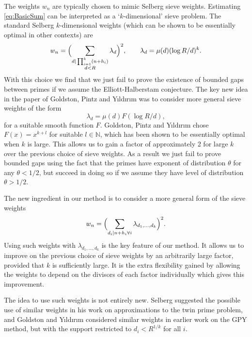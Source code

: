\documentclass[12pt,a4paper]{amsart}
\theoremstyle{plain}
\numberwithin{sblmm}{thrm}
\numberwithin{equation}{section}
\begin{document}
The weights $w_n$ are typically chosen to mimic Selberg sieve weights. Estimating \eqref{eq:BasicSum} can be interpreted as a `$k$-dimensional' sieve problem. The standard Selberg $k$-dimensional weights (which can be shown to be essentially optimal in other contexts) are
\begin{equation}
w_n=\Bigl(\sum_{\substack{d|\prod_{i=1}^k(n+h_i)\\ d<R}}\lambda_d\Bigr)^2,\qquad \lambda_d=\mu(d)(\log{R/d})^k.
\end{equation}
With this choice we find that we just fail to prove the existence of bounded gaps between primes if we assume the Elliott-Halberstam conjecture. The key new idea in the paper of Goldston, Pintz and Y\i ld\i r\i m \cite{GPY} was to consider more general sieve weights of the form
\begin{equation}
\lambda_d=\mu(d)F(\log{R/d}),\label{eq:GPYWeights}
\end{equation}
for a suitable smooth function $F$. Goldston, Pintz and Y\i ld\i r\i m chose $F(x)=x^{k+l}$ for suitable $l\in\mathbb{N}$, which has been shown to be essentially optimal when $k$ is large. This allows us to gain a factor of approximately \num{2} for large $k$ over the previous choice of sieve weights. As a result we just fail to prove bounded gaps using the fact that the primes have exponent of distribution $\theta$ for any $\theta<1/2$, but succeed in doing so if we assume they have level of distribution $\theta>1/2$. 

The new ingredient in our method is to consider a more general form of the sieve weights
\begin{equation}
w_n=\Bigl(\sum_{d_i|n+h_i\forall i}\lambda_{d_1,\dotsc,d_k}\Bigr)^2.\label{eq:WChoice}
\end{equation}
Using such weights with $\lambda_{d_1,\dotsc,d_k}$ is the key feature of our method. It allows us to improve on the previous choice of sieve weights by an arbitrarily large factor, provided that $k$ is sufficiently large. It is the extra flexibility gained by allowing the weights to depend on the divisors of each factor individually which gives this improvement.

The idea to use such weights is not entirely new. Selberg \cite[Page 245]{Selberg:CollectedWorks} suggested the possible use of similar weights in his work on approximations to the twin prime problem, and Goldston and Y\i ld\i r\i m \cite{GoldstonYildirim} considered similar weights in earlier work on the GPY method, but with the support restricted to $d_i<R^{1/k}$ for all $i$.
\end{document}
